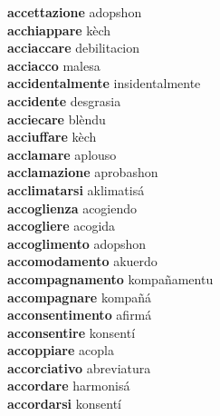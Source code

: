\textbf{accettazione } adopshon \\
\textbf{acchiappare } kèch \\
\textbf{acciaccare } debilitacion \\
\textbf{acciacco } malesa \\
\textbf{accidentalmente } insidentalmente \\
\textbf{accidente } desgrasia \\
\textbf{acciecare } blèndu \\
\textbf{acciuffare } kèch \\
\textbf{acclamare } aplouso \\
\textbf{acclamazione } aprobashon \\
\textbf{acclimatarsi } aklimatisá \\
\textbf{accoglienza } acogiendo \\
\textbf{accogliere } acogida \\
\textbf{accoglimento } adopshon \\
\textbf{accomodamento } akuerdo \\
\textbf{accompagnamento } kompañamentu \\
\textbf{accompagnare } kompañá \\
\textbf{acconsentimento } afirmá \\
\textbf{acconsentire } konsentí \\
\textbf{accoppiare } acopla \\
\textbf{accorciativo } abreviatura \\
\textbf{accordare } harmonisá \\
\textbf{accordarsi } konsentí \\
